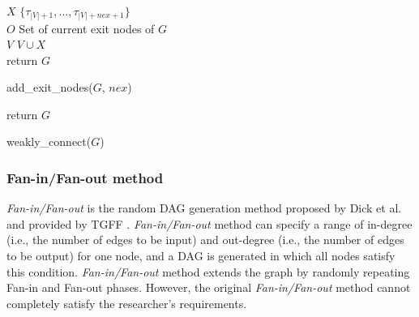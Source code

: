 \begin{algorithm}[t]
    {\footnotesize
    $X$ \la $\{\tau_{|V|+1}, ..., \tau_{|V|+nex+1}\}$ \\
    $O$ \la Set of current exit nodes of $G$ \\
    $V$ \la $V \cup X$ \\
    return $G$
    \caption{add\_exit\_nodes($G$, $nex$)}
    \label{alg: add_exit_nodes}
    }
\end{algorithm}


\begin{algorithm}[t]
    {\footnotesize
        return $G$
        \caption{weakly\_connect($G$)}
        \label{alg: weakly_connect}
    }
\end{algorithm}


\subsubsection{Fan-in/Fan-out method}
\label{sssec: fan_in_fan_out}

{\it Fan-in/Fan-out} is the random DAG generation method proposed by Dick et al. and provided by TGFF \cite{tgff}.
{\it Fan-in/Fan-out} method can specify a range of in-degree (i.e., the number of edges to be input) and out-degree (i.e., the number of edges to be output) for one node, and a DAG is generated in which all nodes satisfy this condition.
    {\it Fan-in/Fan-out} method extends the graph by randomly repeating Fan-in and Fan-out phases.
However, the original {\it Fan-in/Fan-out} method cannot completely satisfy the researcher's requirements.

